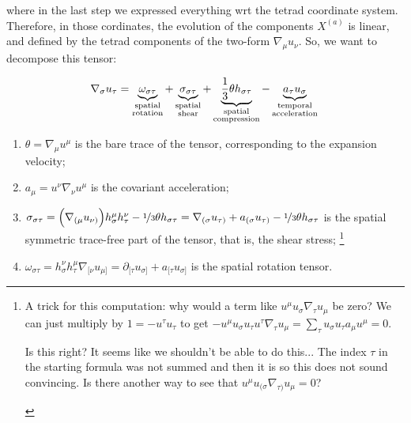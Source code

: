 \documentclass[main.tex]{subfiles}
\begin{document}
where in the last step we expressed everything wrt the tetrad coordinate system. Therefore, in those cordinates, the evolution of the components \(X^{(a)}\) is linear, and defined by the tetrad components of the two-form \(\nabla_\mu u_\nu\). So, we want to decompose this tensor:

\begin{equation} \label{eq:covariant-acceleration-decomposition}
    \nabla_\sigma u_\tau =
    \underbrace{\omega_{\sigma \tau}}_{\substack{\text{spatial} \\ \text{rotation}}}
    + \underbrace{\sigma_{\sigma\tau}}_{\substack{\text{spatial} \\ \text{shear}}}
    + \underbrace{\frac{1}{3} \theta h_{\sigma\tau}}_{\substack{\text{spatial} \\
    \text{compression}}}
    - \underbrace{ a_\tau u_\sigma}_{\substack{\text{temporal} \\ \text{acceleration}}} \\
\end{equation}

\begin{enumerate}
    \item \(\theta = \nabla_\mu u^\mu\) is the bare trace of the tensor, corresponding to the expansion velocity;
    \item \(a_\mu = u^\nu \nabla_\nu u^\mu\) is the covariant acceleration;
    \item \(\sigma_{\sigma \tau} = \qty(\nabla_{(\mu} u_{\nu)}) h^\mu_\sigma h^\nu _\tau - \frac[i]{1}{3} \theta h_{\sigma \tau} = \nabla_{(\sigma} u_{\tau)} + a_{(\sigma} u_{\tau)} - \frac[i]{1}{3} \theta h_{\sigma \tau} \) is the spatial symmetric trace-free part of the tensor, that is, the shear stress;
    \footnote{A trick for this computation: why would a term like \(u^\mu u_\sigma \nabla_\tau u_\mu\) be zero? We can just multiply by \(1 = - u^\tau u_\tau\) to get \(-u^\mu u_\sigma u_\tau u^\tau \nabla_\tau u_\mu = \sum_\tau u_\sigma u_\tau a_\mu u^\mu = 0\).
    \begin{greenbox}
        Is this right? It seems like we shouldn't be able to do this... The index \(\tau\) in the starting formula was not summed and then it is so this does not sound convincing. Is there another way to see that \(u^\mu u_{(\sigma} \nabla_{\tau)} u_\mu = 0\)?
    \end{greenbox}}
    \item \(\omega_{\sigma \tau} = h^\nu_\sigma h^\mu_\tau \nabla_{[\nu} u_{\mu]} = \partial_{[\tau} u_{\sigma]} + a_{[\tau} u_{\sigma]}\) is the spatial rotation tensor.
\end{enumerate}
\end{document}
